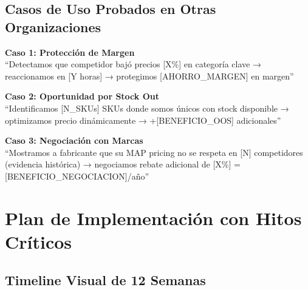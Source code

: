 \documentclass[12pt,a4paper]{article}
\begin{document}
\subsection{Casos de Uso Probados en Otras Organizaciones}

\begin{tcolorbox}[colback=successgreen!10, colframe=successgreen]
\textbf{Caso 1: Protección de Margen}\\
``Detectamos que competidor bajó precios [X\%] en categoría clave → reaccionamos en [Y horas] → protegimos [AHORRO\_MARGEN] en margen''
\end{tcolorbox}

\begin{tcolorbox}[colback=primaryblue!10, colframe=primaryblue]
\textbf{Caso 2: Oportunidad por Stock Out}\\
``Identificamos [N\_SKUs] SKUs donde somos únicos con stock disponible → optimizamos precio dinámicamente → +[BENEFICIO\_OOS] adicionales''
\end{tcolorbox}

\begin{tcolorbox}[colback=successgreen!10, colframe=successgreen]
\textbf{Caso 3: Negociación con Marcas}\\
``Mostramos a fabricante que su MAP pricing no se respeta en [N] competidores (evidencia histórica) → negociamos rebate adicional de [X\%] = [BENEFICIO\_NEGOCIACION]/año''
\end{tcolorbox}

\newpage
\section{Plan de Implementación con Hitos Críticos}

\subsection{Timeline Visual de 12 Semanas}
\end{document}
